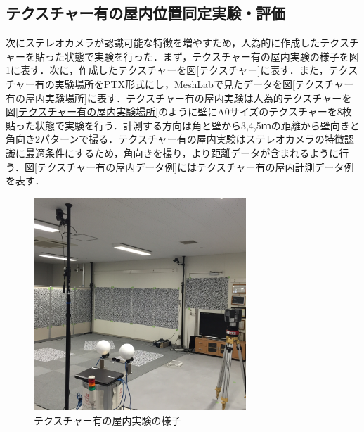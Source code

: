 \subsection{テクスチャー有の屋内位置同定実験・評価}

次にステレオカメラが認識可能な特徴を増やすため，人為的に作成したテクスチャーを貼った状態で実験を行った．まず，テクスチャー有の屋内実験の様子を図{\ref{テクスチャー有の屋内実験のキャップチャ－}}に表す．次に，作成したテクスチャーを図{\ref{テクスチャー}}に表す．また，テクスチャー有の実験場所をPTX形式にし，MeshLabで見たデータを図{\ref{テクスチャー有の屋内実験場所}}に表す．テクスチャー有の屋内実験は人為的テクスチャーを図{\ref{テクスチャー有の屋内実験場所}}のように壁にA0サイズのテクスチャーを8枚貼った状態で実験を行う．計測する方向は角と壁から3,4,5ｍの距離から壁向きと角向き2パターンで撮る．テクスチャー有の屋内実験はステレオカメラの特徴認識に最適条件にするため，角向きを撮り，より距離データが含まれるように行う．図{\ref{テクスチャー有の屋内データ例}}にはテクスチャー有の屋内計測データ例を表す．


%
\begin{figure}[htbp]
  \begin{center}
   \includegraphics[height=80mm]{figure/テクスチャー有の屋内実験のキャップチャ－.eps}
   \caption{テクスチャー有の屋内実験の様子}
   \label{テクスチャー有の屋内実験のキャップチャ－}
  \end{center}
\end{figure}
%

